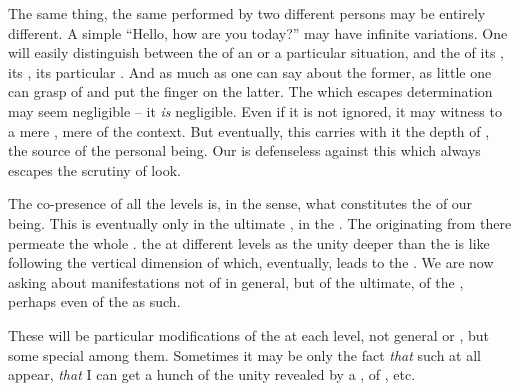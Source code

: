 {The same thing, the same  performed by two different persons 
may be entirely different. A simple ``Hello, how are you today?'' may 
have infinite variations. One will easily distinguish between the 
 of an  or a particular situation, and the  
of its , its , its particular . And as 
much as one can say about the former, as little one can grasp of and put 
the finger on the latter. The  which escapes  
determination may seem negligible --  it {\em is} 
negligible. Even if it is not ignored, it may witness to a mere 
, mere  of the context. But eventually, this  
carries with it the depth of , the source of the 
personal being. Our  is defenseless against this 
 which always escapes the scrutiny of  look. 




%

\pa
The co-presence of all the levels is, in the sense, what constitutes 
the  of our being. This  is eventually  only in the 
ultimate , in the . The 
 originating from there permeate the whole 
.  the  at different levels 
as the unity  deeper than the  is like 
following the vertical dimension of  which, eventually, 
leads to the .
We are now asking about manifestations not of 
 in general, but of the ultimate, of the , 
perhaps even of the  as such.


These  will be particular modifications of the  at
each level, not general  or , but some special among
them. Sometimes it may be only the fact {\em that} such  at all
appear, {\em that} I can get a hunch of the unity revealed by a , of
, etc.

}
